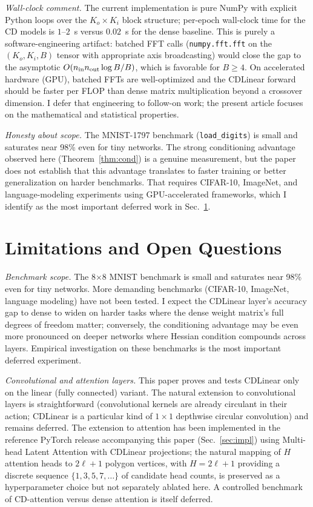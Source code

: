 \documentclass[aps,prx,onecolumn,11pt,nofootinbib,longbibliography]{revtex4-2}
\begin{document}
\textit{Wall-clock comment.}  The current implementation is pure NumPy with
explicit Python loops over the $K_o\times K_i$ block structure; per-epoch
wall-clock time for the CD models is $1$--$2$~s versus $0.02$~s for the
dense baseline.  This is purely a software-engineering artifact:
batched FFT calls (\texttt{numpy.fft.fft} on the $(K_o, K_i, B)$ tensor with
appropriate axis broadcasting) would close the gap to the asymptotic
$O(n_{\rm in} n_{\rm out} \log B / B)$, which is favorable for $B \geq 4$.
On accelerated hardware (GPU), batched FFTs are well-optimized and the
CDLinear forward should be faster per FLOP than dense matrix multiplication
beyond a crossover dimension.  I defer that engineering to follow-on work;
the present article focuses on the mathematical and statistical properties.

\textit{Honesty about scope.}  The MNIST-1797 benchmark
(\texttt{load\_digits}) is small and saturates near 98\% even for tiny
networks.  The strong conditioning advantage observed here
(Theorem~\ref{thm:cond}) is a genuine measurement, but the paper does not
establish that this advantage translates to faster training or better
generalization on harder benchmarks.  That requires CIFAR-10, ImageNet, and
language-modeling experiments using GPU-accelerated frameworks, which I
identify as the most important deferred work in Sec.~\ref{sec:limits}.

\section{Limitations and Open Questions}
\label{sec:limits}

\textit{Benchmark scope.}  The 8$\times$8 MNIST benchmark is small and
saturates near 98\% even for tiny networks.  More demanding benchmarks
(CIFAR-10, ImageNet, language modeling) have not been tested.  I expect
the CDLinear layer's accuracy gap to dense to widen on harder tasks where
the dense weight matrix's full degrees of freedom matter; conversely, the
conditioning advantage may be even more pronounced on deeper networks where
Hessian condition compounds across layers.  Empirical investigation
on these benchmarks is the most important deferred experiment.

\textit{Convolutional and attention layers.}  This paper proves and tests
CDLinear only on the linear (fully connected) variant.  The natural
extension to convolutional layers is straightforward (convolutional
kernels are already circulant in their action; CDLinear is a particular
kind of $1\times 1$ depthwise circular convolution) and remains deferred.
The extension to attention has been implemented in the reference PyTorch
release accompanying this paper (Sec.~\ref{sec:impl}) using Multi-head
Latent Attention with CDLinear projections; the natural mapping of $H$
attention heads to $2\ell+1$ polygon vertices, with $H = 2\ell+1$ providing
a discrete sequence $\{1,3,5,7,\ldots\}$ of candidate head counts, is
preserved as a hyperparameter choice but not separately ablated here.
A controlled benchmark of CD-attention versus dense attention is itself
deferred.
\end{document}
